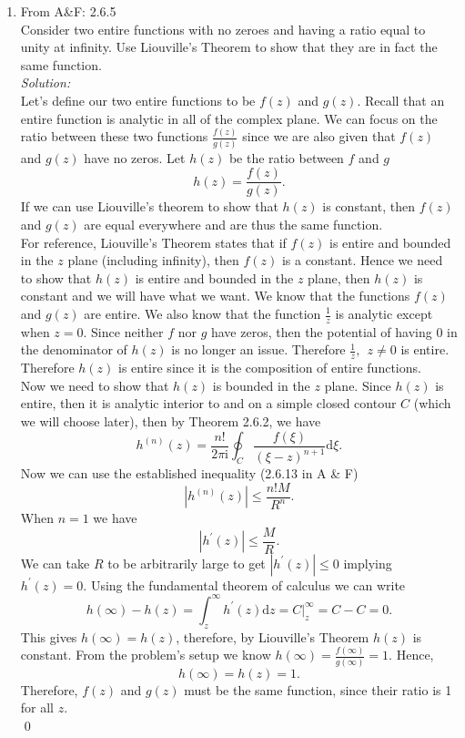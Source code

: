 \documentclass[10pt]{amsart}
\newcommand{\D}{\mathrm{d}}
\newcommand{\I}{\mathrm{i}}
\theoremstyle{nonumberplain}
\begin{document}
\begin{enumerate}[label={\bf {\arabic*}:}]
\item  From A\&F: 2.6.5\\
Consider two entire functions with no zeroes and having a ratio equal to unity at infinity.
Use Liouville's Theorem to show that they are in fact the same function. \\
\textit{Solution:} \\
Let's define our two entire functions to be $f(z)$ and $g(z)$.
Recall that an entire function is analytic in all of the complex plane.
We can focus on the ratio between these two functions $\frac {f(z)}{g(z)}$ since we are also given that $f(z)$ and $g(z)$ have no zeros.
Let $h(z)$ be the ratio between $f$ and $g$
$$ h(z) = \frac {f(z)}{g(z)}. $$
If we can use Liouville's theorem to show that $h(z)$ is constant, then $f(z)$ and $g(z)$ are equal everywhere and are thus the same function. \\

\noindent
For reference, Liouville's Theorem states that if $f(z)$ is entire and bounded in the $z$ plane (including infinity), then $f(z)$ is a constant.
Hence we need to show that $h(z)$ is entire and bounded in the $z$ plane, then $h(z)$ is constant and we will have what we want.
We know that the functions $f(z)$ and $g(z)$ are entire. We also know that the function $\frac 1 {z}$ is analytic except when $z = 0$.
Since neither $f$ nor $g$ have zeros, then the potential of having $0$ in the denominator of $h(z)$ is no longer an issue.
Therefore $\frac 1 z,\:\: z\neq 0$ is entire.
Therefore $h(z)$ is entire since it is the composition of entire functions. \\

\noindent
Now we need to show that $h(z)$ is bounded in the $z$ plane.
Since $h(z)$ is entire, then it is analytic interior to and on a simple closed contour $C$ (which we will choose later), then by Theorem 2.6.2, we have
$$
h^{(n)}(z) = \frac {n!}{2 \pi \I} \oint_C \frac {f(\xi)}{(\xi - z)^{n + 1}} \D \xi.
$$
Now we can use the established inequality (2.6.13 in A \& F)
$$
\left| h^{(n)}(z) \right| \leq \frac {n!M}{R^n}.
$$
When $n = 1$ we have
$$
\left| h^\prime(z) \right| \leq \frac {M}{R}.
$$
We can take $R$ to be arbitrarily large to get $\left| h^\prime(z) \right| \leq 0$ implying $h^\prime(z) = 0$.
Using the fundamental theorem of calculus we can write
$$
h(\infty) - h(z) = \int_z^{\infty} h^\prime(z) \D z = \left. C \right|_z^{\infty} = C - C = 0.
$$
This gives $h(\infty) = h(z)$, therefore, by Liouville's Theorem $h(z)$ is constant.
From the problem's setup we know $h(\infty) = \frac {f(\infty)}{g(\infty)} = 1$.
Hence,
$$h(\infty) = h(z) = 1.$$
Therefore, $f(z)$ and $g(z)$ must be the same function, since their ratio is 1 for all $z$.\\
\qed
\\
\newpage


\end{enumerate}
\end{document}
